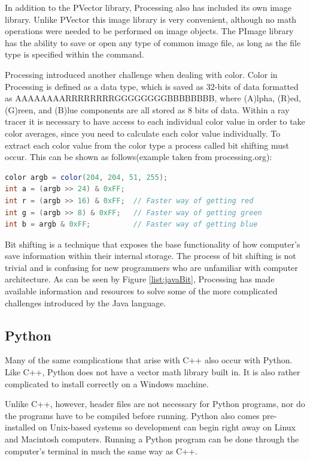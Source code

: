 In addition to the PVector library, Processing also has included its own image library.  Unlike PVector this image library is very convenient, although no math operations were needed to be performed on image objects.  The PImage library has the ability to save or open any type of common image file, as long as the file type is specified within the command.

Processing introduced another challenge when dealing with color.  Color in Processing is defined as a data type, which is saved as 32-bits of data formatted as AAAAAAAARRRRRRRRGGGGGGGGBBBBBBBB, where (A)lpha, (R)ed, (G)reen, and (B)lue components are all stored as 8 bits of data. Within a ray tracer it is necessary to have access to each individual color value in order to take color averages, since you need to calculate each color value individually.  To extract each color value from the color type a process called bit shifting must occur. This can be shown as follows(example taken from processing.org):

\singlespacing
\begin{lstlisting}[language=Java, caption=Java bit shifting to extract color data, style=mystyle, label=list:javaBit]
color argb = color(204, 204, 51, 255);
int a = (argb >> 24) & 0xFF;
int r = (argb >> 16) & 0xFF;  // Faster way of getting red
int g = (argb >> 8) & 0xFF;   // Faster way of getting green
int b = argb & 0xFF;          // Faster way of getting blue
\end{lstlisting}
\doublespacing
Bit shifting is a technique that exposes the base functionality of how computer's save information within their internal storage. The process of bit shifting is not trivial and is confusing for new programmers who are unfamiliar with computer architecture.  As can be seen by Figure \ref{list:javaBit}, Processing has made available information and resources to solve some of the more complicated challenges introduced by the Java language.

\subsection{Python}
Many of the same complications that arise with C++ also occur with Python.  Like C++, Python does not have a vector math library built in.  It is also rather complicated to install correctly on a Windows machine.

Unlike C++, however, header files are not necessary for Python programs, nor do the programs have to be compiled before running.  Python also comes pre-installed on Unix-based systems so development can begin right away on Linux and Macintosh computers.  Running a Python program can be done through the computer's terminal in much the same way as C++.

